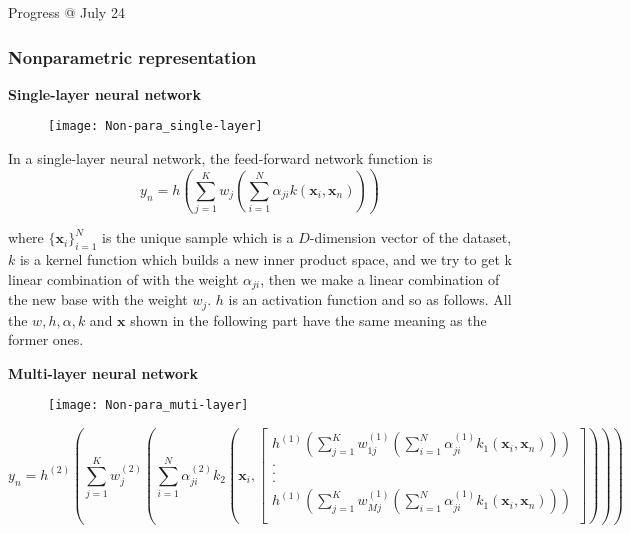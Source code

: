 \documentclass{article}
\begin{document}
\color[rgb]{0.5,0.5,0.5}
\newpage
\LARGE Progress @ July 24\normalsize\vspace{3ex}

\subsubsection{Nonparametric representation}

\par \textbf{Single-layer neural network}\\

\begin{figure}[h]
\centering
\texttt{[image: Non-para\_single-layer]}
\end{figure}

\par In a single-layer neural network, the feed-forward network function is 
\begin{equation}
y_n = h \left( \sum\limits_{j=1}^{K} w_{j} \left( \sum\limits_{i=1}^{N} \alpha_{ji} k( \mathbf{x}_{i} , \mathbf{x}_{n}) \right)\right)
\end{equation} 

where $ \{ \mathbf{x}_{i}\}_{i=1}^{N}$ is the unique sample which is a $D$-dimension vector of the dataset, $k$ is a kernel function which builds a new inner product space, and we try to get k linear combination of with the weight $\alpha_{ji}$, then we make a linear combination of the new base with the weight $ w_{j}$. $h$ is an activation function and so as follows.  
All the $w, h, \alpha, k$ and $\mathbf{x}$ shown in the following part have the same meaning as the former ones.\\



\par \textbf{Multi-layer neural network} \\

\begin{figure}[h]
\centering
\texttt{[image: Non-para\_muti-layer]}
\end{figure}

\begin{equation}
y_n = h^{(2)} \left( \sum\limits_{j=1}^{K} w_{j}^{(2)} \left( \sum\limits_{i=1}^{N} \alpha_{ji}^{(2)} k_2( \mathbf{x}_{i},\left[               
  \begin{array}{c}   
    h^{(1)} \left( \sum\limits_{j=1}^{K} w_{1j}^{(1)} \left( \sum\limits_{i=1}^{N} \alpha_{ji}^{(1)}k_1( \mathbf{x}_{i},\mathbf{x}_n) \right) \right)\\  
    .\\  
    .\\  
    .\\
    h^{(1)} \left( \sum\limits_{j=1}^{K} w_{Mj}^{(1)} \left( \sum\limits_{i=1}^{N} \alpha_{ji}^{(1)}k_1( \mathbf{x}_{i},\mathbf{x}_n) \right) \right)\\
  \end{array}
\right] )
 \right) \right)
\end{equation} 
\end{document}
